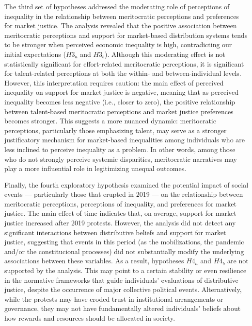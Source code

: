 \documentclass[
  12pt,
]{article}
\begin{document}
The third set of hypotheses addressed the moderating role of perceptions
of inequality in the relationship between meritocratic perceptions and
preferences for market justice. The analysis revealed that the positive
association between meritocratic perceptions and support for
market-based distribution systems tends to be stronger when perceived
economic inequality is high, contradicting our initial expectations
(\(H3_{a}\) and \(H3_{b}\)). Although this moderating effect is not
statistically significant for effort-related meritocratic perceptions,
it is significant for talent-related perceptions at both the within- and
between-individual levels. However, this interpretation requires
caution: the main effect of perceived inequality on support for market
justice is negative, meaning that as perceived inequality becomes less
negative (i.e., closer to zero), the positive relationship between
talent-based meritocratic perceptions and market justice preferences
becomes stronger. This suggests a more nuanced dynamic: meritocratic
perceptions, particularly those emphasizing talent, may serve as a
stronger justificatory mechanism for market-based inequalities among
individuals who are less inclined to perceive inequality as a problem.
In other words, among those who do not strongly perceive systemic
disparities, meritocratic narratives may play a more influential role in
legitimizing unequal outcomes.

Finally, the fourth exploratory hypothesis examined the potential impact
of social events --- particularly those that erupted in 2019 --- on the
relationship between meritocratic perceptions, perceptions of
inequality, and preferences for market justice. The main effect of time
indicates that, on average, support for market justice increased after
2019 protests. However, the analysis did not detect any significant
interactions between distributive beliefs and support for market
justice, suggesting that events in this period (as the mobilizations,
the pandemic and/or the constitucional processes) did not substantially
modify the underlying associations between these variables. As a result,
hypotheses \(H4_{a}\) and \(H4_{b}\) are not supported by the analysis.
This may point to a certain stability or even resilience in the
normative frameworks that guide individuals' evaluations of distributive
justice, despite the occurrence of major collective political events.
Alternatively, while the protests may have eroded trust in institutional
arrangements or governance, they may not have fundamentally altered
individuals' beliefs about how rewards and resources should be allocated
in society.
\end{document}

